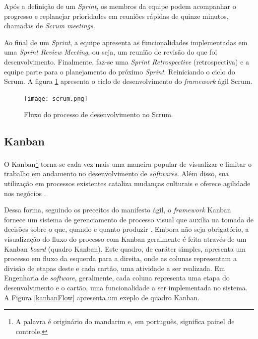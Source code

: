 Após a definição de um \textit{Sprint}, os membros da equipe podem acompanhar o progresso e replanejar prioridades em reuniões rápidas de quinze minutos, chamadas de \textit{Scrum meetings}.

Ao final de um \textit{Sprint}, a equipe apresenta as funcionalidades implementadas em uma \textit{Sprint Review Meeting}, ou seja, um reunião de revisão do que foi desenvolvimento. Finalmente, faz-se uma \textit{Sprint Retrospective} (retrospectiva) e a equipe parte para o planejamento do próximo \textit{Sprint}. Reiniciando o ciclo do Scrum. A figura \ref{scrumFlow} apresenta o ciclo de desenvolvimento do \textit{framework} ágil Scrum.

\begin{figure}[ht]
    \caption{Fluxo do processo de desenvolvimento no Scrum.}
       	\begin{center}
            \texttt{[image: scrum.png]}
        \end{center}
    \label{scrumFlow}
\end{figure}

\subsection{Kanban}
\label{fundSWSCRUM}

O Kanban\footnote{A palavra é originário do mandarim e, em português, significa painel de controle.} torna-se cada vez mais uma maneira popular de visualizar e limitar o trabalho em andamento no desenvolvimento de \textit{softwares}. Além disso, sua utilização em processos existentes cataliza mudanças culturais e oferece agilidade nos negócios \cite{kanbanBook}.

Dessa forma, seguindo os preceitos do manifesto ágil, o \textit{framework} Kanban fornece um sistema de gerenciamento de processo visual que auxilia na tomada de decisões sobre o que, quando e quanto produzir \cite{kanbanBook2}. Embora não seja obrigatório, a visualização do fluxo do processo com Kanban geralmente é feita através de um Kanban \textit{board} (quadro Kanban). Este quadro, de caráter simples, apresenta um processo em fluxo da esquerda para a direita, onde as colunas representam a divisão de etapas deste e cada cartão, uma atividade a ser realizada. Em Engenharia de \textit{software}, geralmente, cada coluna representa uma etapa do desenvolvimento e o cartão, uma funcionalidade a ser implementada no sistema. A Figura \ref{kanbanFlow} apresenta um exeplo de quadro Kanban.

